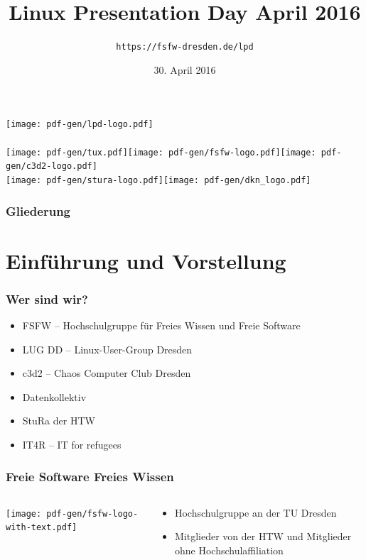 \documentclass[t]{beamer}
\title{Linux Presentation Day April 2016}
\author{\texttt{https://fsfw-dresden.de/lpd}}
\date[30.04.2016]{30. April 2016}
\begin{document}
\begin{frame}
  \begin{center}%
\texttt{[image: pdf-gen/lpd-logo.pdf]}\\%
\vspace{0.5cm}\\
{\texttt{[image: pdf-gen/tux.pdf]}\hspace{0.5cm}\texttt{[image: pdf-gen/fsfw-logo.pdf]}\hspace{0.5cm}\texttt{[image: pdf-gen/c3d2-logo.pdf]}\\[0.1cm]
\texttt{[image: pdf-gen/stura-logo.pdf]}}\hspace{0.5cm}\texttt{[image: pdf-gen/dkn\_logo.pdf]}
  \end{center}
\end{frame}

\begin{frame}
  \frametitle{Gliederung}
  \tableofcontents
\end{frame}

\section{Einführung und Vorstellung}
\begin{frame}
  \frametitle{Wer sind wir?}
  \begin{itemize}
  \item FSFW – Hochschulgruppe für Freies Wissen und Freie Software
  \item LUG DD – Linux-User-Group Dresden
  \item c3d2 – Chaos Computer Club Dresden
  \item Datenkollektiv
  \item StuRa der HTW
  \item IT4R – IT for refugees
  \end{itemize}
\end{frame}

\begin{frame}
  \frametitle{Freie Software Freies Wissen}
  \begin{columns}
    \begin{column}[T]{0.45\textwidth}
      \texttt{[image: pdf-gen/fsfw-logo-with-text.pdf]}
    \end{column}
    \begin{column}{0.45\textwidth}
      \begin{itemize}
      \item Hochschulgruppe an der TU Dresden
      \item Mitglieder von der HTW und Mitglieder ohne Hochschulaffiliation
      \end{itemize}
    \end{column}
  \end{columns}
\end{frame}
\end{document}
